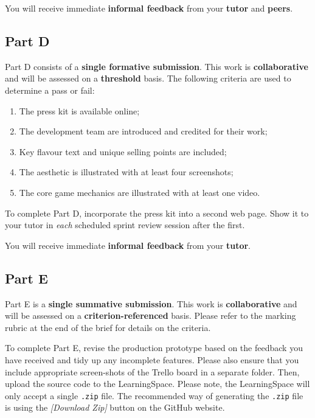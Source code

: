 \documentclass{../fal_assignment}
\begin{document}
You will receive immediate \textbf{informal feedback} from your \textbf{tutor} and \textbf{peers}.

\subsection*{Part D}

Part D consists of a \textbf{single formative submission}. This work is \textbf{collaborative} and will be assessed on a \textbf{threshold} basis. The following criteria are used to determine a pass or fail:

\begin{enumerate}[label=(\alph*)]
	\item The press kit is available online;
	\item The development team are introduced and credited for their work;
	\item Key flavour text and unique selling points are included;
	\item The aesthetic is illustrated with at least four screenshots;
	\item The core game mechanics are illustrated with at least one video.
\end{enumerate}

To complete Part D, incorporate the press kit into a second web page. Show it to your tutor in \textit{each} scheduled sprint review session after the first.

You will receive immediate \textbf{informal feedback} from your \textbf{tutor}.


\subsection*{Part E}

Part E is a \textbf{single summative submission}. This work is \textbf{collaborative} and will be assessed on a \textbf{criterion-referenced} basis. Please refer to the marking rubric at the end of the brief for details on the criteria.

To complete Part E, revise the production prototype based on the feedback you have received and tidy up any incomplete features. Please also ensure that you include appropriate screen-shots of the Trello board in a separate folder. Then, upload the source code to the LearningSpace. Please note, the LearningSpace will only accept a single \texttt{.zip} file. The recommended way of generating the \texttt{.zip} file is using the \textit{[Download Zip]} button on the GitHub website.
\end{document}

